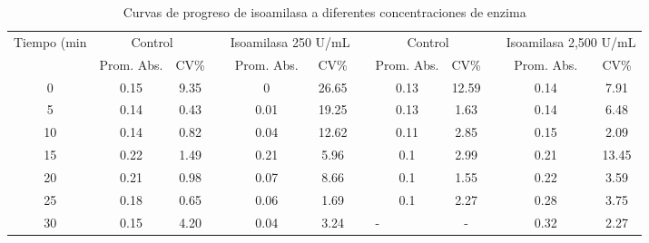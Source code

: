 \documentclass{article}
\begin{document}
\begin{table}[H]
	\centering
	\caption{Curvas de progreso de isoamilasa a diferentes concentraciones de enzima}
	\begin{adjustbox}{width=\textwidth}
	\begin{tabular}{cccccccp{5em}cccc}
		\toprule
		\multicolumn{1}{c}{\multirow{2}[4]{*}{Tiempo (min}} & \multicolumn{2}{c}{Control} &       & \multicolumn{2}{c}{Isoamilasa 250 U/mL} &       & \multicolumn{2}{c}{Control} &       & \multicolumn{2}{c}{Isoamilasa 2,500 U/mL} \\
		\cmidrule{2-3}\cmidrule{5-6}\cmidrule{8-9}\cmidrule{11-12}          & Prom. Abs. & CV\%  &       & Prom. Abs. & CV\%  &       & \multicolumn{1}{c}{Prom. Abs.} & CV\%  &       & Prom. Abs. & CV\% \\
		\midrule
		0     & 0.15  & 9.35  &       & 0     & 26.65 &       & \multicolumn{1}{c}{0.13} & 12.59 &       & 0.14  & 7.91 \\
		5     & 0.14  & 0.43  &       & 0.01  & 19.25 &       & \multicolumn{1}{c}{0.13} & 1.63  &       & 0.14  & 6.48 \\
		10    & 0.14  & 0.82  &       & 0.04  & 12.62 &       & \multicolumn{1}{c}{0.11} & 2.85  &       & 0.15  & 2.09 \\
		15    & 0.22  & 1.49  &       & 0.21  & 5.96  &       & \multicolumn{1}{c}{0.1} & 2.99  &       & 0.21  & 13.45 \\
		20    & 0.21  & 0.98  &       & 0.07  & 8.66  &       & \multicolumn{1}{c}{0.1} & 1.55  &       & 0.22  & 3.59 \\
		25    & 0.18  & 0.65  &       & 0.06  & 1.69  &       & \multicolumn{1}{c}{0.1} & 2.27  &       & 0.28  & 3.75 \\
		30    & 0.15  & 4.20  &       & 0.04  & 3.24  &       & \centering-                                  & \centering-     &       & 0.32  & 2.27 \\
		\bottomrule
	\end{tabular}%
	\end{adjustbox}
	\label{tab:c1}%
\end{table}%
\end{document}
